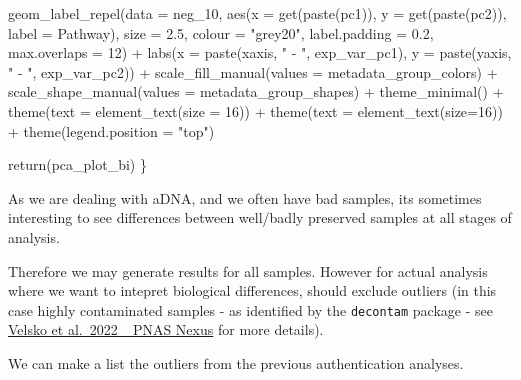 \documentclass[
  letterpaper,
]{book}
\newenvironment{Shaded}{}{}
\newcommand{\AttributeTok}[1]{\textcolor[rgb]{0.84,0.23,0.29}{#1}}
\newcommand{\DecValTok}[1]{\textcolor[rgb]{0.00,0.36,0.77}{#1}}
\newcommand{\FloatTok}[1]{\textcolor[rgb]{0.00,0.36,0.77}{#1}}
\newcommand{\FunctionTok}[1]{\textcolor[rgb]{0.44,0.26,0.76}{#1}}
\newcommand{\NormalTok}[1]{\textcolor[rgb]{0.14,0.16,0.18}{#1}}
\newcommand{\SpecialCharTok}[1]{\textcolor[rgb]{0.00,0.36,0.77}{#1}}
\newcommand{\StringTok}[1]{\textcolor[rgb]{0.01,0.18,0.38}{#1}}
\begin{document}
\begin{Shaded}
\begin{Highlighting}[]
      \FunctionTok{geom\_label\_repel}\NormalTok{(}\AttributeTok{data =}\NormalTok{ neg\_10,}
                   \FunctionTok{aes}\NormalTok{(}\AttributeTok{x =} \FunctionTok{get}\NormalTok{(}\FunctionTok{paste}\NormalTok{(pc1)), }\AttributeTok{y =} \FunctionTok{get}\NormalTok{(}\FunctionTok{paste}\NormalTok{(pc2)), }\AttributeTok{label =}\NormalTok{ Pathway),}
                   \AttributeTok{size =} \FloatTok{2.5}\NormalTok{, }\AttributeTok{colour =} \StringTok{"grey20"}\NormalTok{, }\AttributeTok{label.padding =} \FloatTok{0.2}\NormalTok{, }\AttributeTok{max.overlaps =} \DecValTok{12}\NormalTok{) }\SpecialCharTok{+}
      \FunctionTok{labs}\NormalTok{(}\AttributeTok{x =} \FunctionTok{paste}\NormalTok{(xaxis, }\StringTok{" {-} "}\NormalTok{, exp\_var\_pc1),}
           \AttributeTok{y =} \FunctionTok{paste}\NormalTok{(yaxis, }\StringTok{" {-} "}\NormalTok{, exp\_var\_pc2)) }\SpecialCharTok{+}
      \FunctionTok{scale\_fill\_manual}\NormalTok{(}\AttributeTok{values =}\NormalTok{ metadata\_group\_colors) }\SpecialCharTok{+}
      \FunctionTok{scale\_shape\_manual}\NormalTok{(}\AttributeTok{values =}\NormalTok{ metadata\_group\_shapes) }\SpecialCharTok{+}
      \FunctionTok{theme\_minimal}\NormalTok{() }\SpecialCharTok{+} \FunctionTok{theme}\NormalTok{(}\AttributeTok{text =} \FunctionTok{element\_text}\NormalTok{(}\AttributeTok{size =} \DecValTok{16}\NormalTok{)) }\SpecialCharTok{+}
      \FunctionTok{theme}\NormalTok{(}\AttributeTok{text =} \FunctionTok{element\_text}\NormalTok{(}\AttributeTok{size=}\DecValTok{16}\NormalTok{)) }\SpecialCharTok{+}
      \FunctionTok{theme}\NormalTok{(}\AttributeTok{legend.position =} \StringTok{"top"}\NormalTok{)}

    \FunctionTok{return}\NormalTok{(pca\_plot\_bi)}
\NormalTok{\}}
\end{Highlighting}
\end{Shaded}

As we are dealing with aDNA, and we often have bad samples, its
sometimes interesting to see differences between well/badly preserved
samples at all stages of analysis.

Therefore we may generate results for all samples. However for actual
analysis where we want to intepret biological differences, should
exclude outliers (in this case highly contaminated samples - as
identified by the \texttt{decontam} package - see
\href{https://doi.org/10.1093/pnasnexus/pgac148}{Velsko et al.~2022
\_PNAS Nexus} for more details).

We can make a list the outliers from the previous authentication
analyses.
\end{document}
